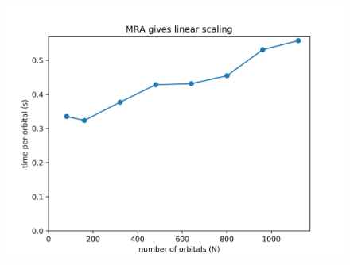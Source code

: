 \documentclass[journal=jctcce, manuscript=article]{achemso}
\begin{document}





\begin{figure}
\centering
\includegraphics[width=\textwidth]{ToCgraph.png}
\label{For Table of Contents Only}
\end{figure}
\end{document}
